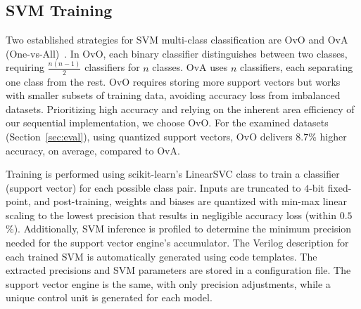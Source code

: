 \subsection{SVM Training} \label{sec:train}
Two established strategies for SVM multi-class classification are OvO and OvA (One-vs-All)~\cite{bishop2006pattern:ovo_ova}.
In OvO, each binary classifier distinguishes between two classes, requiring $\frac{n(n-1)}{2}$ classifiers for $n$ classes.
OvA uses $n$ classifiers, each separating one class from the rest.
OvO requires storing more support vectors but works with smaller subsets of training data, avoiding accuracy loss from imbalanced datasets.
Prioritizing high accuracy and relying on the inherent area efficiency of our sequential implementation, we choose OvO.
For the examined datasets (Section~\ref{sec:eval}), using quantized support vectors, OvO delivers $8.7$\% higher accuracy, on average, compared to OvA.


Training is performed using scikit-learn's LinearSVC class to train a classifier (support vector) for each possible class pair.
Inputs are truncated to $4$-bit fixed-point, and post-training, weights and biases are quantized with min-max linear scaling to the lowest precision that results in negligible accuracy loss (within $0.5$\%).
Additionally, SVM inference is profiled to determine the minimum precision needed for the support vector engine’s accumulator.
The Verilog description for each trained SVM is automatically generated using code templates.
The extracted precisions and SVM parameters are stored in a configuration file.
The support vector engine is the same, with only precision adjustments, while a unique control unit is generated for each model.

